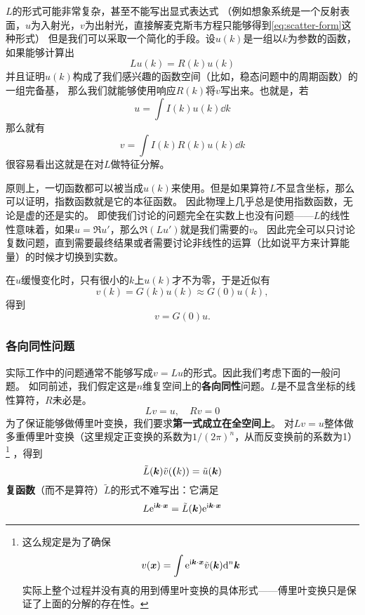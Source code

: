 \documentclass[UTF8, a4paper]{ctexart}
\newcommand*{\ii}{\mathrm{i}}
\newcommand*{\ee}{\mathrm{e}}
\begin{document}
$L$的形式可能非常复杂，甚至不能写出显式表达式
（例如想象系统是一个反射表面，$u$为入射光，$v$为出射光，直接解麦克斯韦方程只能够得到\eqref{eq:scatter-form}这种形式）
但是我们可以采取一个简化的手段。设$u(k)$是一组以$k$为参数的函数，如果能够计算出
\[
    L u(k) = R(k) u(k)
\]
并且证明$u(k)$构成了我们感兴趣的函数空间（比如，稳态问题中的周期函数）的一组完备基，
那么我们就能够使用响应$R(k)$将$v$写出来。也就是，若
\begin{equation}
    u = \int I(k) u(k) \dd k
\end{equation}
那么就有
\begin{equation}
    v = \int I(k) R(k) u(k) \dd k
\end{equation}
很容易看出这就是在对$L$做特征分解。

原则上，一切函数都可以被当成$u(k)$来使用。但是如果算符$L$不显含坐标，那么可以证明，指数函数就是它的本征函数。
因此物理上几乎总是使用指数函数，无论是虚的还是实的。
即使我们讨论的问题完全在实数上也没有问题——$L$的线性性意味着，如果$u = \Re u'$，那么$\Re (L u')$就是我们需要的$v$。
因此完全可以只讨论复数问题，直到需要最终结果或者需要讨论非线性的运算（比如说平方来计算能量）的时候才切换到实数。

在$u$缓慢变化时，只有很小的$k$上$u(k)$才不为零，于是近似有
\[
    v(k) = G(k) u(k) \approx G(0) u(k),
\] 
得到
\[
    v = G(0) u.
\]

\subsubsection{各向同性问题}
实际工作中的问题通常不能够写成$v=Lu$的形式。因此我们考虑下面的一般问题。
如同前述，我们假定这是$n$维复空间上的\textbf{各向同性}问题。$L$是不显含坐标的线性算符，$R$未必是。
\begin{equation}
    L v = u, \quad R v = 0
    \label{eq:response}
\end{equation}
为了保证能够做傅里叶变换，我们要求\textbf{第一式成立在全空间上}。
对$L v = u$整体做多重傅里叶变换（这里规定正变换的系数为$1/(2\pi)^n$，从而反变换前的系数为1）%
\footnote{这么规定是为了确保
\[
    v(\vb*{x}) = \int \ee^{\ii \vb*{k} \cdot \vb*{x}} \tilde{v}(\vb*{k}) \dd^n \vb*{k}
\]
实际上整个过程并没有真的用到傅里叶变换的具体形式——傅里叶变换只是保证了上面的分解的存在性。
}%
，得到
\[
    \tilde{L}(\vb*{k}) \tilde{v}(\vb*(k)) = \tilde{u}(\vb*{k})
\]
\textbf{复函数}（而不是算符）$\tilde{L}$的形式不难写出：它满足
\begin{equation}
    L \ee^{\ii \vb*{k} \cdot \vb*{x}} = \tilde{L}(\vb*{k}) \ee^{\ii \vb*{k} \cdot \vb*{x}}
\end{equation}
\end{document}
